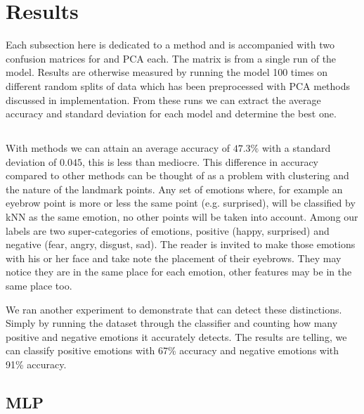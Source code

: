 \section{Results}

Each subsection here is dedicated to a method and is accompanied with two confusion matrices for \tsne and PCA each. The matrix is from a single run of the model. Results are otherwise measured by running the model 100 times on different random splits of data which has been preprocessed with PCA methods discussed in implementation. From these runs we can extract the average accuracy and standard deviation for each model and determine the best one.

\subsection{\knn}


With \knn methods we can attain an average accuracy of $47.3\%$ with a standard deviation of $0.045$, this is less than mediocre. This difference in accuracy compared to other methods can be thought of as a problem with clustering and the nature of the landmark points. Any set of emotions where, for example an eyebrow point is more or less the same point (e.g. surprised), will be classified by kNN as the same emotion, no other points will be taken into account. Among our labels are two super-categories of emotions, positive (happy, surprised) and negative (fear, angry, disgust, sad). The reader is invited to make those emotions with his or her face and take note the placement of their eyebrows. They may notice they are in the same place for each emotion, other features may be in the same place too.

We ran another experiment to demonstrate that \knn can detect these distinctions. Simply by running the dataset through the \knn classifier and counting how many positive and negative emotions it accurately detects. The results are telling, we can classify positive emotions with 67\% accuracy and negative emotions with 91\% accuracy.

\subsection{MLP}


